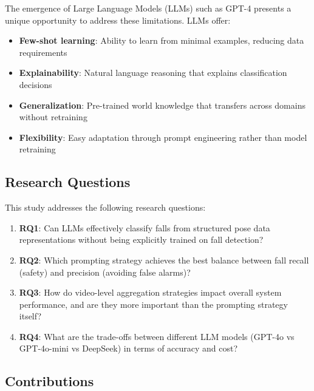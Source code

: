 \documentclass[conference]{IEEEtran}
\begin{document}
The emergence of Large Language Models (LLMs) such as GPT-4 presents a unique opportunity to address these limitations. LLMs offer:
\begin{itemize}[leftmargin=*]
    \item \textbf{Few-shot learning}: Ability to learn from minimal examples, reducing data requirements
    \item \textbf{Explainability}: Natural language reasoning that explains classification decisions
    \item \textbf{Generalization}: Pre-trained world knowledge that transfers across domains without retraining
    \item \textbf{Flexibility}: Easy adaptation through prompt engineering rather than model retraining
\end{itemize}

\subsection{Research Questions}

This study addresses the following research questions:
\begin{enumerate}[leftmargin=*]
    \item \textbf{RQ1}: Can LLMs effectively classify falls from structured pose data representations without being explicitly trained on fall detection?
    \item \textbf{RQ2}: Which prompting strategy achieves the best balance between fall recall (safety) and precision (avoiding false alarms)?
    \item \textbf{RQ3}: How do video-level aggregation strategies impact overall system performance, and are they more important than the prompting strategy itself?
    \item \textbf{RQ4}: What are the trade-offs between different LLM models (GPT-4o vs GPT-4o-mini vs DeepSeek) in terms of accuracy and cost?
\end{enumerate}

\subsection{Contributions}
\end{document}
